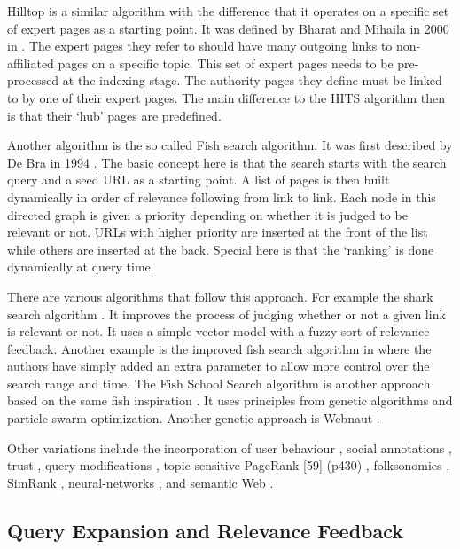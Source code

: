 Hilltop is a similar algorithm with the difference that it operates on a specific set of expert pages as a starting point. It was defined by Bharat and Mihaila in 2000 in \autocite{Bharat2000}. The expert pages they refer to should have many outgoing links to non-affiliated pages on a specific topic. This set of expert pages needs to be pre-processed at the indexing stage. The authority pages they define must be linked to by one of their expert pages. The main difference to the HITS algorithm then is that their `hub' pages are predefined.

Another algorithm is the so called Fish search algorithm. It was first described by De Bra in 1994 \autocite{DeBra1994, DeBra1994a, DeBra}. The basic concept here is that the search starts with the search query and a seed URL as a starting point. A list of pages is then built dynamically in order of relevance following from link to link. Each node in this directed graph is given a priority depending on whether it is judged to be relevant or not. URLs with higher priority are inserted at the front of the list while others are inserted at the back. Special here is that the `ranking' is done dynamically at query time.

There are various algorithms that follow this approach. For example the shark search algorithm \autocite{Hersovici1998}. It improves the process of judging whether or not a given link is relevant or not. It uses a simple vector model with a fuzzy sort of relevance feedback. Another example is the improved fish search algorithm in \autocite{Luo2005} where the authors have simply added an extra parameter to allow more control over the search range and time. The Fish School Search algorithm is another approach based on the same fish inspiration \autocite{BastosFilho2008}. It uses principles from genetic algorithms and particle swarm optimization. Another genetic approach is Webnaut \autocite{Nick2001}.

Other variations include the incorporation of user behaviour \autocite{Agichtein2006}, social annotations \autocite{Bao2007}, trust \autocite{Garcia-Molina2004}, query modifications \autocite{Glover2001}, topic sensitive PageRank [59] (p430) \autocite{Haveliwala2003}, folksonomies \autocite{Hotho}, SimRank \autocite{Jeh}, neural-networks \autocite{Shu1999}, and semantic Web \autocite{Widyantoro2001,Du2007,Ding,Kamps,Taye2009}.


\subsection{Query Expansion and Relevance Feedback}
\label{s:qexpansion}

